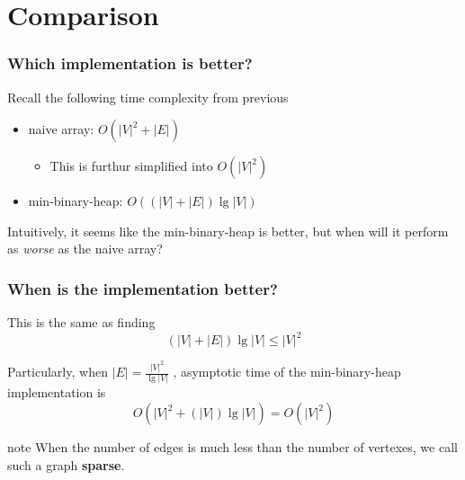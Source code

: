 \documentclass{beamer}
\begin{document}
\section{Comparison}
\begin{frame}
	\frametitle{Which implementation is better?}
	Recall the following time complexity from previous 
	\begin{itemize}
		\item naive array: \( O( \lvert{ V }\rvert^2 + \lvert{ E }\rvert)  \) 
		\begin{itemize}
			\item This is furthur simplified into \( O( \lvert{ V }\rvert^2) \)
		\end{itemize}
		\item min-binary-heap: \( O(( \lvert{ V }\rvert + \lvert{ E }\rvert) \lg{\lvert{V}\rvert})  \)
	\end{itemize}	
	Intuitively, it seems like the min-binary-heap is better, but when will it perform as \emph{worse} as the naive array? \newline

\end{frame}

\begin{frame}
	\frametitle{When is the implementation better?}

	This is the same as finding 
	\[
		(\lvert{ V }\rvert + \lvert{ E }\rvert)\lg \lvert{ V }\rvert \leq \lvert{ V }\rvert^2 
	\]

	Particularly, when \( \lvert{ E }\rvert = \frac{ \lvert{ V }\rvert^2 }{ \lg \lvert{ V }\rvert   }    \) , asymptotic time of the min-binary-heap implementation is
	\[
		O(\lvert{ V }\rvert^2 + (\lvert{ V }\rvert )\lg \lvert{ V }\rvert)  = O(\lvert{ V }\rvert^2)
	\]

	 \begin{block}{note}
		When the number of edges is much less than the number of vertexes, we call such a graph \textbf{sparse}.
	\end{block}
\end{frame}
\end{document}

